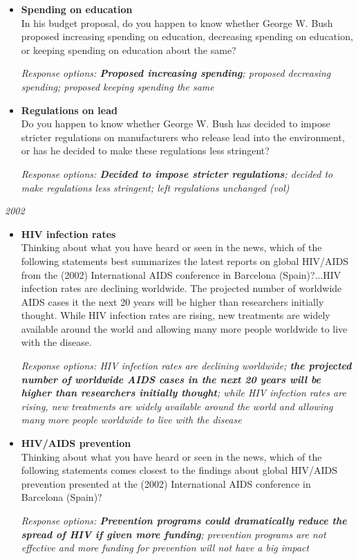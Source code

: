 \documentclass[12pt, letterpaper]{article}
\begin{document}
  \begin{itemize}
\item \textbf{Spending on education}\\
In his budget proposal, do you happen to know whether George W. Bush proposed increasing spending on education, decreasing spending on education, or keeping spending on education about the same?

\textit{Response options: \textbf{Proposed increasing spending}; proposed decreasing spending; proposed keeping spending the same}
\end{itemize}

  \begin{itemize}
\item \textbf{Regulations on lead}\\
Do you happen to know whether George W. Bush has decided to impose stricter regulations on manufacturers who release lead into the environment, or has he decided to make these regulations less stringent?

\textit{Response options: \textbf{Decided to impose stricter regulations}; decided to make regulations less stringent; left regulations unchanged (vol)}
\end{itemize}

 \large \noindent \textit{2002} 
\normalsize

  \begin{itemize}
\item \textbf{HIV infection rates}\\
Thinking about what you have heard or seen in the news, which of the following statements best summarizes the latest reports on global HIV/AIDS from the (2002) International AIDS conference in Barcelona (Spain)?...HIV infection rates are declining worldwide. The projected number of worldwide AIDS cases it the next 20 years will be higher than researchers initially thought. While HIV infection rates are rising, new treatments are widely available around the world and allowing many more people worldwide to live with the disease.

\textit{Response options: HIV infection rates are declining worldwide; \textbf{the projected number of worldwide AIDS cases in the next 20 years will be higher than researchers initially thought}; while HIV infection rates are rising, new treatments are widely available around the world and allowing many more people worldwide to live with the disease}
\end{itemize}

  \begin{itemize}
\item \textbf{HIV/AIDS prevention}\\
Thinking about what you have heard or seen in the news, which of the following statements comes closest to the findings about global HIV/AIDS prevention presented at the (2002) International AIDS conference in Barcelona (Spain)?

\textit{Response options: \textbf{Prevention programs could dramatically reduce the spread of HIV if given more funding}; prevention programs are not effective and more funding for prevention will not have a big impact}
\end{itemize}
\end{document}
